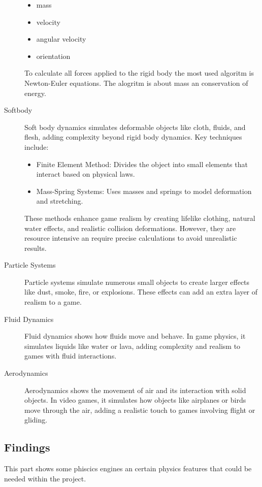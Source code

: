 \documentclass{projdoc}
\begin{document}
\begin{description}
		\begin{itemize}
			\item mass
			\item velocity
			\item angular velocity
			\item orientation
		\end{itemize}
		To calculate all forces applied to the rigid body the most used algoritm is
		Newton-Euler equations. The alogritm is about mass an conservation of energy.
	\item[Softbody] Soft body dynamics simulates deformable objects like cloth, fluids,
		and flesh, adding complexity beyond rigid body dynamics. Key techniques
		include:\noparbreak
		\begin{itemize}
			\item Finite Element Method: Divides the object into small elements that
				interact based on physical laws.
			\item Mass-Spring Systems: Uses masses and springs to model deformation and
				stretching.
		\end{itemize}
		These methods enhance game realism by creating lifelike clothing, natural water
		effects, and realistic collision deformations. However, they are resource
		intensive an require precise calculations to avoid unrealistic results.
		\item[Particle Systems] Particle systems simulate numerous small objects to
			create larger effects like dust, smoke, fire, or explosions. These effects can
			add an extra layer of realism to a game.
		\item[Fluid Dynamics] Fluid dynamics shows how fluids move and behave. In game
			physics, it simulates liquids like water or lava, adding complexity and realism
			to games with fluid interactions.
		\item[Aerodynamics] Aerodynamics shows the movement of air and its interaction
			with solid objects. In video games, it simulates how objects like airplanes or
			birds move through the air, adding a realistic touch to games involving flight
			or gliding.
\end{description}

\subsection{Findings}

This part shows some phiscics engines an certain physics features that could be
needed within the project.
\end{document}
